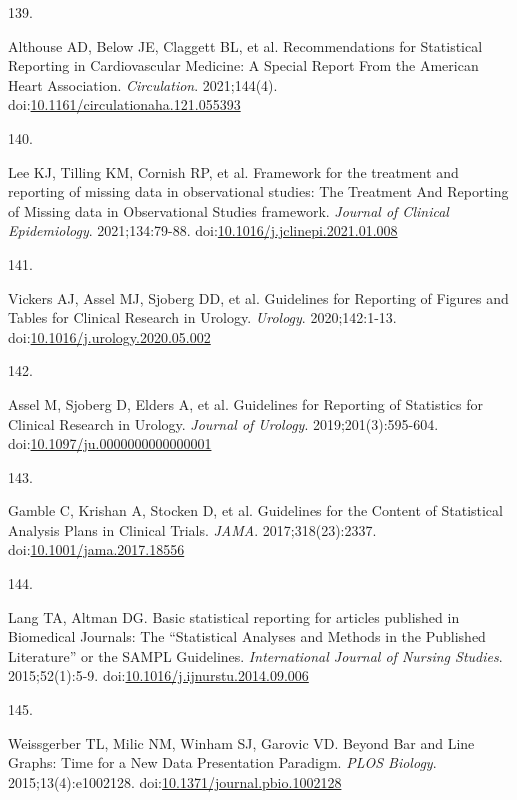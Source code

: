 \documentclass[
]{book}
\newlength{\cslhangindent}
\newlength{\csllabelwidth}
\newlength{\cslentryspacingunit} %
\newenvironment{CSLReferences}[2] %
 {%
  \setlength{\parindent}{0pt}
  \ifodd #1
  \let\oldpar\par
  \def\par{\hangindent=\cslhangindent\oldpar}
  \fi
  \setlength{\parskip}{#2\cslentryspacingunit}
 }%
 {}
\newcommand{\CSLLeftMargin}[1]{\parbox[t]{\csllabelwidth}{#1}}
\newcommand{\CSLRightInline}[1]{\parbox[t]{\linewidth - \csllabelwidth}{#1}\break}
\begin{document}
\begin{CSLReferences}{0}{0}
\leavevmode{}%
\CSLLeftMargin{139. }%
\CSLRightInline{Althouse AD, Below JE, Claggett BL, et al. Recommendations for Statistical Reporting in Cardiovascular Medicine: A Special Report From the American Heart Association. \emph{Circulation}. 2021;144(4). doi:\href{https://doi.org/10.1161/circulationaha.121.055393}{10.1161/circulationaha.121.055393}}

\leavevmode{}%
\CSLLeftMargin{140. }%
\CSLRightInline{Lee KJ, Tilling KM, Cornish RP, et al. Framework for the treatment and reporting of missing data in observational studies: The Treatment And Reporting of Missing data in Observational Studies framework. \emph{Journal of Clinical Epidemiology}. 2021;134:79-88. doi:\href{https://doi.org/10.1016/j.jclinepi.2021.01.008}{10.1016/j.jclinepi.2021.01.008}}

\leavevmode{}%
\CSLLeftMargin{141. }%
\CSLRightInline{Vickers AJ, Assel MJ, Sjoberg DD, et al. Guidelines for Reporting of Figures and Tables for Clinical Research in Urology. \emph{Urology}. 2020;142:1-13. doi:\href{https://doi.org/10.1016/j.urology.2020.05.002}{10.1016/j.urology.2020.05.002}}

\leavevmode{}%
\CSLLeftMargin{142. }%
\CSLRightInline{Assel M, Sjoberg D, Elders A, et al. Guidelines for Reporting of Statistics for Clinical Research in Urology. \emph{Journal of Urology}. 2019;201(3):595-604. doi:\href{https://doi.org/10.1097/ju.0000000000000001}{10.1097/ju.0000000000000001}}

\leavevmode{}%
\CSLLeftMargin{143. }%
\CSLRightInline{Gamble C, Krishan A, Stocken D, et al. Guidelines for the Content of Statistical Analysis Plans in Clinical Trials. \emph{JAMA}. 2017;318(23):2337. doi:\href{https://doi.org/10.1001/jama.2017.18556}{10.1001/jama.2017.18556}}

\leavevmode{}%
\CSLLeftMargin{144. }%
\CSLRightInline{Lang TA, Altman DG. Basic statistical reporting for articles published in Biomedical Journals: The {``}Statistical Analyses and Methods in the Published Literature{''} or the SAMPL Guidelines. \emph{International Journal of Nursing Studies}. 2015;52(1):5-9. doi:\href{https://doi.org/10.1016/j.ijnurstu.2014.09.006}{10.1016/j.ijnurstu.2014.09.006}}

\leavevmode{}%
\CSLLeftMargin{145. }%
\CSLRightInline{Weissgerber TL, Milic NM, Winham SJ, Garovic VD. Beyond Bar and Line Graphs: Time for a New Data Presentation Paradigm. \emph{PLOS Biology}. 2015;13(4):e1002128. doi:\href{https://doi.org/10.1371/journal.pbio.1002128}{10.1371/journal.pbio.1002128}}


\end{CSLReferences}
\end{document}
